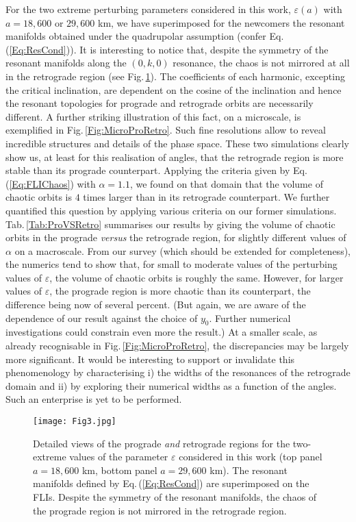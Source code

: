 \documentclass{amsart}
\theoremstyle{definition}
\theoremstyle{remark}
\numberwithin{equation}{section}
\begin{document}
For the two extreme perturbing parameters considered in this work, $\varepsilon(a)$ with $a=18,600$ or $29,600$ km, we have superimposed for the newcomers the resonant manifolds obtained under the quadrupolar assumption (confer Eq.\,(\ref{Eq:ResCond})).  It is interesting to notice  that,
despite the symmetry of the resonant manifolds along the $(0,k,0)$ resonance, the chaos is not mirrored at all in the retrograde region (see Fig.\,\ref{Fig:PRwManifolds}). 
{\color{black}The coefficients of each harmonic, excepting the critical inclination, are dependent on the cosine of the inclination and hence the resonant topologies for prograde and retrograde orbits are necessarily different.}
A further striking illustration of this fact, on a microscale, is exemplified in Fig.\,\ref{Fig:MicroProRetro}. Such  fine resolutions allow to reveal incredible structures and details of the phase space. These two simulations clearly show us, at least for this realisation of angles, that the retrograde region is more stable than its prograde counterpart. Applying the criteria given by Eq.\,(\ref{Eq:FLIChaos}) with $\alpha=1.1$, we found on that domain that the volume of chaotic orbits is $4$ times larger than in its retrograde counterpart.  
We further quantified this question by applying various criteria on our former simulations. 
Tab.\,\ref{Tab:ProVSRetro} summarises our results by giving the volume of chaotic orbits in the prograde \textit{versus} the retrograde region,    
for slightly different values of $\alpha$ on a macroscale.  From our survey (which should be extended for completeness), the numerics tend to show that, for
small to moderate values of the perturbing values of $\varepsilon$, the 
volume of chaotic orbits is roughly the same. However, for larger values of $\varepsilon$, the prograde region is more chaotic than its counterpart, the difference being now of several percent. 
(But again, we are aware of the dependence of our result against the choice of $y_{0}$.
Further numerical investigations could constrain even more the result.)
At a smaller scale, as already recognisable  in Fig.\,\ref{Fig:MicroProRetro}, the discrepancies may be largely more significant.  
It would be interesting to support or invalidate this phenomenology by characterising i) the widths of the resonances of the retrograde domain and ii) by exploring their numerical widths as a function of the angles. Such an enterprise is {\color{black}yet} to be performed.


\begin{figure}
\centering
\texttt{[image: Fig3.jpg]}
\caption{\label{Fig:PRwManifolds} 
Detailed views of the prograde \textit{and} retrograde regions for the two-extreme values of the parameter $\varepsilon$ considered in this work ({\color{black}top panel $a=18,600$ km, bottom panel $a=29,600$ km}). 
The resonant manifolds defined by Eq.\,(\ref{Eq:ResCond}) are superimposed on the FLIs. Despite the symmetry of the resonant manifolds, the chaos of the prograde region is not mirrored in the retrograde region.}
\end{figure}
\end{document}
